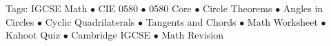 \documentclass[11pt,a4paper]{article}
\begin{document}
\vspace{14pt}
\begin{center}
  \sffamily\scriptsize\textcolor{textmuted}{
    Tags: IGCSE Math $\bullet$ CIE 0580 $\bullet$ 0580 Core $\bullet$ Circle Theorems $\bullet$ Angles in Circles $\bullet$ Cyclic Quadrilaterals $\bullet$ Tangents and Chords $\bullet$ Math Worksheet $\bullet$ Kahoot Quiz $\bullet$ Cambridge IGCSE $\bullet$ Math Revision
  }
\end{center}
\end{document}
